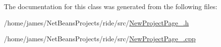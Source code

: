 The documentation for this class was generated from the following files\-:\begin{DoxyCompactItemize}
\item 
/home/james/\-Net\-Beans\-Projects/ride/src/\hyperlink{_new_project_page__1_8h}{New\-Project\-Page\-\_.\-h}\item 
/home/james/\-Net\-Beans\-Projects/ride/src/\hyperlink{_new_project_page__1_8cpp}{New\-Project\-Page\-\_.\-cpp}\end{DoxyCompactItemize}
